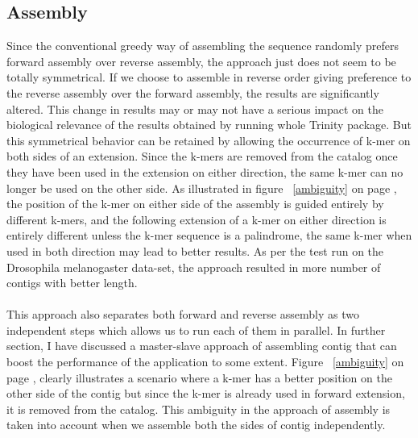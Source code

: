 \label{key}\documentclass[plainarticle, english ,zihtitle,final,hyperref,utf8]{zihpub}
\begin{document}
\subsection{Assembly}
Since the conventional greedy way of assembling the sequence randomly prefers forward assembly over reverse assembly, the approach just does not seem to be totally symmetrical. If we choose to assemble in reverse order giving preference to the reverse assembly over the forward assembly, the results are significantly altered. This change in results may or may not have a serious impact on the biological relevance of the results obtained by running whole Trinity package. But this symmetrical behavior can be retained by allowing the occurrence of k-mer on both sides of an extension. Since the k-mers are removed from the catalog once they have been used in the extension on either direction, the same k-mer can no longer be used on the other side. As illustrated in figure ~\ref{ambiguity} on page \pageref{ambiguity}, the position of the k-mer on either side of the assembly is guided entirely by different k-mers, and the following extension of a k-mer on either direction is entirely different unless the k-mer sequence is a palindrome, the same k-mer when used in both direction may lead to better results. As per the test run on the Drosophila melanogaster data-set, the approach resulted in more number of contigs with better length.
\paragraph{} This approach also separates both forward and reverse assembly as two independent steps which allows us to run each of them in parallel. In further section, I have discussed a master-slave approach of assembling contig that can boost the performance of the application to some extent. Figure  ~\ref{ambiguity} on page \pageref{ambiguity}, clearly illustrates a scenario where a k-mer has a better position on the other side of the contig but since the k-mer is already used in forward extension, it is removed from the catalog. This ambiguity in the approach of assembly is taken into account when we assemble both the sides of contig independently.
\end{document}
